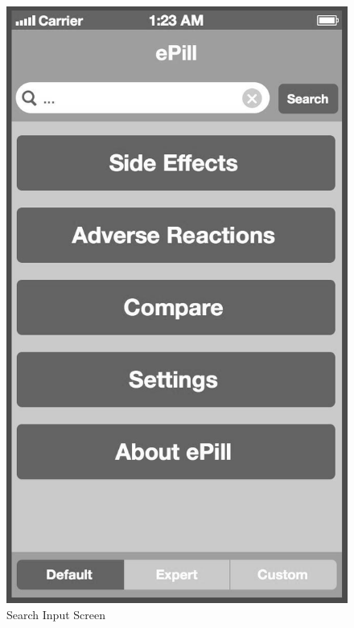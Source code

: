 \begin{figure}[!ptbh]
\begin{minipage}[b]{0.45\linewidth}
        \includegraphics[width=0.8025\linewidth]{figures/Screen_1_bw.jpg}
        \caption[Search Input Screen]{Search Input Screen}
        \label{fig:SearchInputScreen}
    \end{minipage}
    \hspace{0.5cm}
    \begin{minipage}[b]{0.45\linewidth}
        \centering

\end{minipage}
\end{figure}
